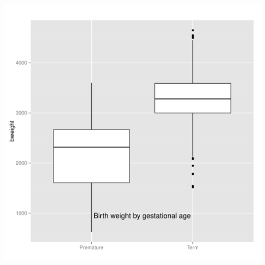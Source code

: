 \documentclass[DIV=calc, paper=a4, fontsize=11pt]{scrartcl}\usepackage[]{graphicx}\usepackage[]{color}
\makeatletter
\def\maxwidth{ %
  \ifdim\Gin@nat@width>\linewidth
    \linewidth
  \else
    \Gin@nat@width
  \fi
}
\newenvironment{knitrout}{}{} %
\makeatother
\begin{document}
\begin{knitrout}
\includegraphics[width=\maxwidth]{figure/unnamed-chunk-33} 

\end{knitrout}
\end{document}
